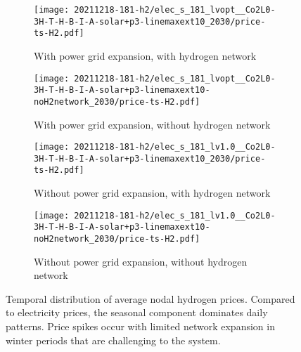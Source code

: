 \begin{figure}
    \begin{subfigure}{0.49\textwidth}
        \centering
        \caption{With power grid expansion, with hydrogen network}
        \texttt{[image: 20211218-181-h2/elec\_s\_181\_lvopt\_\_Co2L0-3H-T-H-B-I-A-solar+p3-linemaxext10\_2030/price-ts-H2.pdf]}
    \end{subfigure}
    \begin{subfigure}{0.49\textwidth}
        \centering
        \caption{With power grid expansion, without hydrogen network}
        \texttt{[image: 20211218-181-h2/elec\_s\_181\_lvopt\_\_Co2L0-3H-T-H-B-I-A-solar+p3-linemaxext10-noH2network\_2030/price-ts-H2.pdf]}
    \end{subfigure}
    \begin{subfigure}{0.49\textwidth}
        \centering
        \caption{Without power grid expansion, with hydrogen network}
        \texttt{[image: 20211218-181-h2/elec\_s\_181\_lv1.0\_\_Co2L0-3H-T-H-B-I-A-solar+p3-linemaxext10\_2030/price-ts-H2.pdf]}
    \end{subfigure}
    \begin{subfigure}{0.49\textwidth}
        \centering
        \caption{Without power grid expansion, without hydrogen network}
        \texttt{[image: 20211218-181-h2/elec\_s\_181\_lv1.0\_\_Co2L0-3H-T-H-B-I-A-solar+p3-linemaxext10-noH2network\_2030/price-ts-H2.pdf]}
    \end{subfigure}
    \caption{Temporal distribution of average nodal hydrogen prices. Compared to
    electricity prices, the seasonal component dominates daily patterns. Price
    spikes occur with limited  network expansion in winter periods that
    are challenging to the system.}
    \label{fig:si:lmp-ts-h2}
\end{figure}


